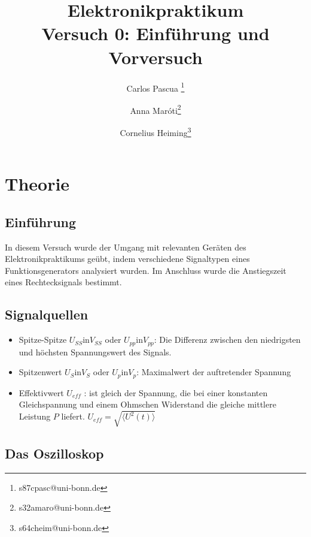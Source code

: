 \documentclass{article}
\begin{document}
    \title{Elektronikpraktikum \\ \textbf{Versuch 0: Einführung und Vorversuch}}
    \author[1]{Carlos Pascua \thanks{s87cpasc@uni-bonn.de}}
    \author[1]{Anna Maróti\thanks{s32amaro@uni-bonn.de}}
    \author[1]{Cornelius Heiming\thanks{s64cheim@uni-bonn.de}}
    \begin{titlepage}
     \maketitle   
    \end{titlepage}
        

\tableofcontents
\newpage
{}

\pagestyle{fancy}
\fancyhead[R]{\thepage}
\fancyhead[L]{\leftmark}

\section{Theorie}

\subsection*{Einführung}
In diesem Versuch wurde der Umgang mit  relevanten Geräten des Elektronikpraktikums geübt, 
indem verschiedene Signaltypen eines Funktionsgenerators analysiert wurden. 
Im Anschluss wurde die Anstiegszeit eines Rechtecksignals bestimmt. 


\subsection*{Signalquellen}
\begin{itemize}
    \item Spitze-Spitze $U_{SS} $in$ V_{SS}$ oder $U_{pp} $in$ V_{pp}$: Die Differenz zwischen den niedrigsten und höchsten Spannungswert des Signals.
    \item Spitzenwert $U_{S}$in$ V_{S}$ oder $U_{p}$in$ V_{p}$: Maximalwert der auftretender Spannung 
    \item Effektivwert $U_{eff}$ : ist gleich der Spannung, die bei einer konstanten Gleichspannung und einem Ohmschen Widerstand die gleiche mittlere Leistung $P$ liefert. $U_{eff}= \sqrt{\langle U^2(t) \rangle}$
\end{itemize}


\subsection*{Das Oszilloskop}
\end{document}
